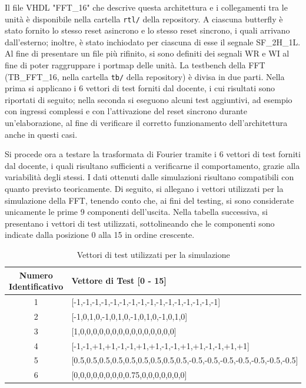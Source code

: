 \noindent Il file VHDL "FFT\_16" che descrive questa architettura e i collegamenti tra le unità è disponibile nella cartella \texttt{rtl/} della repository. A ciascuna butterfly è stato fornito lo stesso reset asincrono e lo stesso reset sincrono, i quali arrivano dall'esterno; inoltre, è stato inchiodato per ciascuna di esse il segnale SF\_2H\_1L. Al fine di presentare un file più rifinito, si sono definiti dei segnali WR e WI al fine di poter raggruppare i portmap delle unità.
\noindent La testbench della FFT (TB\_FFT\_16, nella cartella \texttt{tb/} della repository) è divisa in due parti. Nella prima si applicano i 6 vettori di test forniti dal docente, i cui risultati sono riportati di seguito; nella seconda si eseguono alcuni test aggiuntivi, ad esempio con ingressi complessi e con l'attivazione del reset sincrono durante un'elaborazione, al fine di verificare il corretto funzionamento dell'architettura anche in questi casi.

\noindent Si procede ora a testare la trasformata di Fourier tramite i 6 vettori di test forniti dal docente, i quali risultano sufficienti a verificarne il comportamento, grazie alla variabilità degli stessi. I dati ottenuti dalle simulazioni risultano compatibili con quanto previsto teoricamente. Di seguito, si allegano i vettori utilizzati per la simulazione della FFT, tenendo conto che, ai fini del testing, si sono considerate unicamente le prime 9 componenti dell'uscita. Nella tabella successiva, si presentano i vettori di test utilizzati, sottolineando che le componenti sono indicate dalla posizione 0 alla 15 in ordine crescente.

\begin{table}[H]
    \centering
    \begin{tabular}{|c|l|}
        \hline
        \textbf{Numero Identificativo} & \textbf{Vettore di Test [0 - 15]} \\
        \hline
        1 & [-1,-1,-1,-1,-1,-1,-1,-1,-1,-1,-1,-1,-1,-1,-1,-1] \\
        \hline
        2 & [-1,0,1,0,-1,0,1,0,-1,0,1,0,-1,0,1,0] \\
        \hline
        3 & [1,0,0,0,0,0,0,0,0,0,0,0,0,0,0,0] \\
        \hline
        4 & [-1,-1,+1,+1,-1,-1,+1,+1,-1,-1,+1,+1,-1,-1,+1,+1] \\
        \hline
        5 & [0.5,0.5,0.5,0.5,0.5,0.5,0.5,0.5,0.5,-0.5,-0.5,-0.5,-0.5,-0.5,-0.5,-0.5] \\
        \hline
        6 & [0,0,0,0,0,0,0,0,0.75,0,0,0,0,0,0,0] \\
        \hline
    \end{tabular}
        \caption{Vettori di test utilizzati per la simulazione}
    \label{tab:vettori_test}
\end{table}

